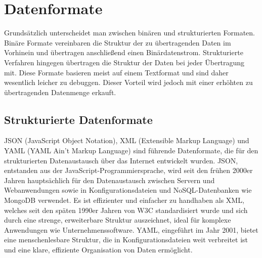 \chapter{Datenformate}

Grundsätzlich unterscheidet man zwischen binären und strukturierten Formaten. Binäre Formate vereinbaren die Struktur der zu übertragenden Daten im Vorhinein und übertragen anschließend einen Binärdatenstrom. Strukturierte Verfahren hingegen übertragen die Struktur der Daten bei jeder Übertragung mit. Diese Formate basieren meist auf einem Textformat und sind daher wesentlich leicher zu debuggen. Dieser Vorteil wird jedoch mit einer erhöhten zu übertragenden Datenmenge erkauft.


\section{Strukturierte Datenformate}

JSON (JavaScript Object Notation), XML (Extensible Markup Language) und YAML (YAML Ain't Markup Language) sind führende Datenformate, die für den strukturierten Datenaustausch über das Internet entwickelt wurden. JSON, entstanden aus der JavaScript-Programmiersprache, wird seit den frühen 2000er Jahren hauptsächlich für den Datenaustausch zwischen Servern und Webanwendungen sowie in Konfigurationsdateien und NoSQL-Datenbanken wie MongoDB verwendet. Es ist effizienter und einfacher zu handhaben als XML, welches seit den späten 1990er Jahren von W3C standardisiert wurde und sich durch eine strenge, erweiterbare Struktur auszeichnet, ideal für komplexe Anwendungen wie Unternehmenssoftware. YAML, eingeführt im Jahr 2001, bietet eine menschenlesbare Struktur, die in Konfigurationsdateien weit verbreitet ist und eine klare, effiziente Organisation von Daten ermöglicht.

